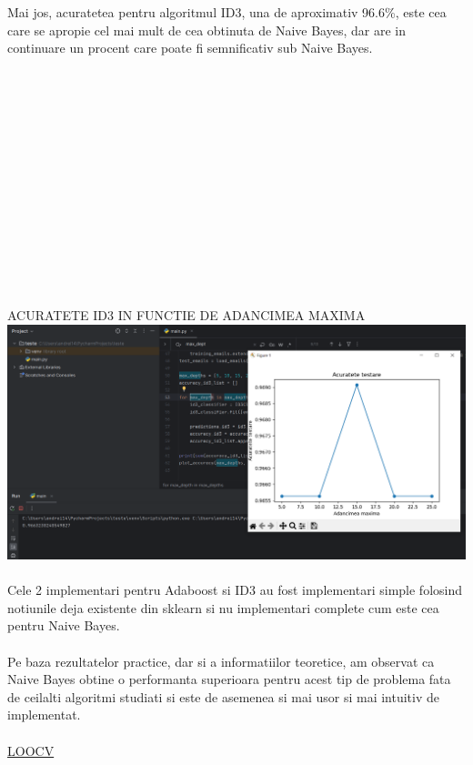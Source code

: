 \documentclass[11pt,leqno]{article}
\begin{document}
{		Mai jos, acuratetea pentru algoritmul ID3, una de aproximativ 96.6\%, este cea care se apropie cel mai mult de cea obtinuta de Naive Bayes, dar are in continuare un procent care poate fi semnificativ sub Naive Bayes.\\\\
		\\\\\\\\\\\\\\\\\\\\\\\\\\
		ACURATETE ID3 IN FUNCTIE DE ADANCIMEA MAXIMA\\
		\includegraphics[scale=0.5]{id3}\\\\
		Cele 2 implementari pentru Adaboost si ID3 au fost implementari simple folosind notiunile deja existente din sklearn si nu implementari complete cum este cea pentru Naive Bayes.
		\\\\
		Pe baza rezultatelor practice, dar si a informatiilor teoretice, am observat ca Naive Bayes obtine o performanta superioara pentru acest tip de problema fata de ceilalti algoritmi studiati si este de asemenea si mai usor si mai intuitiv de implementat.
	}
\\\\
	{\large \underline{LOOCV} }
	\\\\
\end{document}
